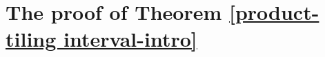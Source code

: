 \documentclass[reqno,a4paper,12pt]{amsart}
\numberwithin{equation}{section}
\newcommand{\N}{{\mathbb N}}
\newcounter{rem}
\newtheorem{proposition}[theorem]{Proposition}
\theoremstyle{remark}
\numberwithin{equation}{section}
\def\N{\mathbb{N}}
\def\red#1{\textcolor[rgb]{1.00,0.00,0.00}{#1}}
\begin{document}

\section{The proof of Theorem \ref{product-tiling interval-intro}}\label{sec3}
\end{document}
